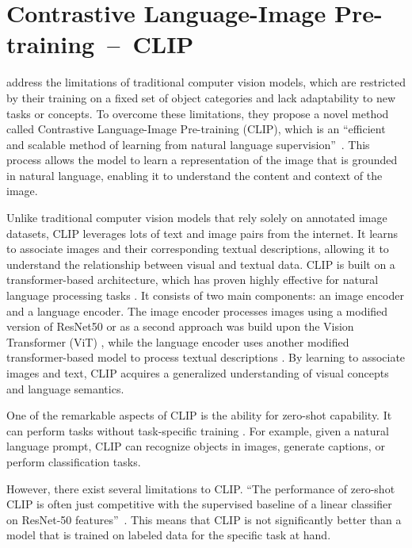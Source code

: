 \section{Contrastive Language-Image Pre-training~--~CLIP}\label{CLIP}

\citeauthor{radfordCLIP} address the limitations of traditional computer vision models, which are restricted by their training on a fixed set of object categories and lack adaptability to new tasks or concepts. To overcome these limitations, they propose a novel method called Contrastive Language-Image Pre-training (CLIP), which is an ``efficient and scalable method of learning from natural language supervision''~\citep{radfordCLIP}. This process allows the model to learn a representation of the image that is grounded in natural language, enabling it to understand the content and context of the image.

Unlike traditional computer vision models that rely solely on annotated image datasets, CLIP leverages lots of text and image pairs from the internet. It learns to associate images and their corresponding textual descriptions, allowing it to understand the relationship between visual and textual data. CLIP is built on a transformer-based architecture, which has proven highly effective for natural language processing tasks \citep{radfordCLIP}. It consists of two main components: an image encoder and a language encoder. The image encoder processes images using a modified version of ResNet50 \citep{heResnet} or as a second approach was build upon the Vision Transformer (ViT) \citep{dosovitskiyViT}, while the language encoder uses another modified transformer-based model to process textual descriptions \citep{vaswani2023attention}. By learning to associate images and text, CLIP acquires a generalized understanding of visual concepts and language semantics.

One of the remarkable aspects of CLIP is the ability for zero-shot capability. It can perform tasks without task-specific training \citep{radfordCLIP}. For example, given a natural language prompt, CLIP can recognize objects in images, generate captions, or perform classification tasks.

However, there exist several limitations to CLIP\@. ``The performance of zero-shot CLIP is often just competitive with the supervised baseline of a linear classifier on ResNet-50 features''~\citep{radfordCLIP}.  This means that CLIP is not significantly better than a model that is trained on labeled data for the specific task at hand.